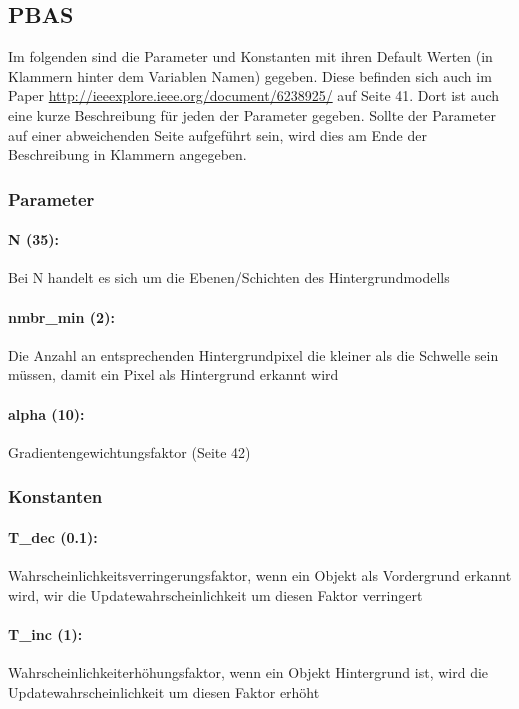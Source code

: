 \documentclass{article}
\begin{document}
	\subsection*{PBAS}
	\label{sub:subsection_name}
	Im folgenden sind die Parameter und Konstanten mit ihren Default Werten (in Klammern hinter dem Variablen Namen) gegeben.
	Diese befinden sich auch im Paper \url{http://ieeexplore.ieee.org/document/6238925/} auf Seite 41. Dort ist auch eine kurze Beschreibung f\"ur jeden der Parameter gegeben. Sollte der Parameter auf einer abweichenden Seite aufgef\"uhrt sein, wird dies am Ende der Beschreibung in Klammern angegeben.
	\subsubsection*{Parameter}
	\label{ssub:parameter}
	
	\paragraph*{N (35):} Bei N handelt es sich um die Ebenen/Schichten des Hintergrundmodells
	\paragraph*{nmbr\_min (2):} Die Anzahl an entsprechenden Hintergrundpixel die kleiner als die Schwelle sein m\"ussen, damit ein Pixel als Hintergrund erkannt wird
	\paragraph*{alpha (10):} Gradientengewichtungsfaktor (Seite 42)

	\subsubsection*{Konstanten}
	\label{ssub:konstanten}
	
	\paragraph*{T\_dec (0.1):} Wahrscheinlichkeitsverringerungsfaktor, wenn ein Objekt als Vordergrund erkannt wird, wir die Updatewahrscheinlichkeit um diesen Faktor verringert
	\paragraph*{T\_inc (1):} Wahrscheinlichkeiterh\"ohungsfaktor, wenn ein Objekt Hintergrund ist, wird die Updatewahrscheinlichkeit um diesen Faktor erh\"oht
\end{document}
